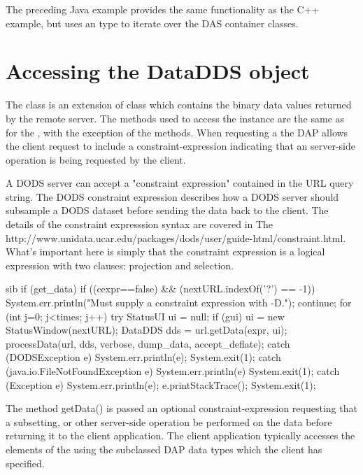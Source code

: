 \documentclass{dods-paper}
\begin{document}
The preceding Java example provides the same functionality as the C++
example, but uses an  type to iterate over the DAS 
container classes.

\section{Accessing the DataDDS object}

The  class is an extension of class  which 
contains the binary data values returned by the remote server.  The
methods used to access the  instance are the same
as for the , with the exception of the 
 methods.  When requesting a  the DAP allows
the client request to include a constraint-expression indicating that
an server-side operation is being requested by the client.

A DODS server can accept a "constraint expression" contained in the
URL query string.  The DODS constraint expression describes how a DODS
server should subsample a DODS dataset before sending the data back to
the client. The details of the constraint expresssion syntax are
covered in The 
{http://www.unidata.ucar.edu/packages/dods/user/guide-html/constraint.html}.
What's important here is simply that the constraint expression is a
logical expression with two clauses: projection and selection.

\begin{vcode}{sib}
 if (get_data) {
    if ((cexpr==false) && (nextURL.indexOf('?') == -1)) {
        System.err.println("Must supply a constraint expression with -D.");
        continue;
    }
    for (int j=0; j<times; j++) {
        try {
           StatusUI ui = null;
           if (gui)
             ui = new StatusWindow(nextURL);
           DataDDS dds = url.getData(expr, ui);
           processData(url, dds, verbose, dump_data, accept_deflate);
        }
        catch (DODSException e) {
          System.err.println(e);
          System.exit(1);
        }
        catch (java.io.FileNotFoundException e) {
          System.err.println(e)
          System.exit(1);
        }
        catch (Exception e) {
          System.err.println(e);
          e.printStackTrace();
          System.exit(1);
        }
    }
 }
\end{vcode}

The  method \lit getData() is passed an optional constraint-expression
requesting that a subsetting, or other server-side operation be performed on the
data before returning it to the client application.
The client application typically accesses the elements of the  
using the subclassed DAP data types which the client has specified.
\end{document}
